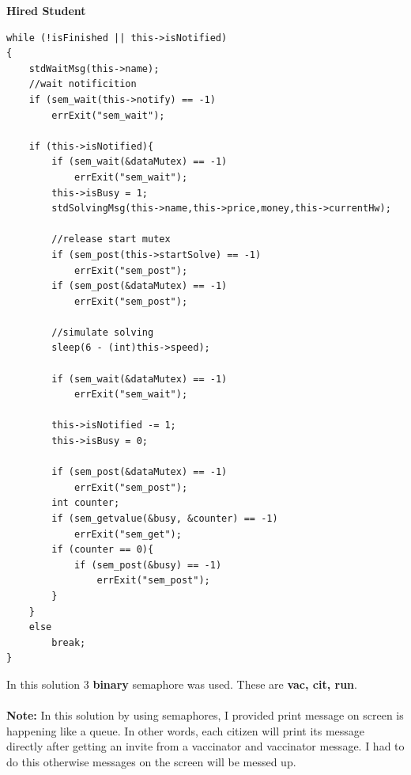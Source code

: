 \documentclass{article}
\begin{document}
\cleardoublepage
\textbf{Hired Student}
\begin{lstlisting}[style=CStyle]
while (!isFinished || this->isNotified)
{
	stdWaitMsg(this->name);
	//wait notificition
	if (sem_wait(this->notify) == -1)
		errExit("sem_wait");
		
	if (this->isNotified){
		if (sem_wait(&dataMutex) == -1)
			errExit("sem_wait");
		this->isBusy = 1;
		stdSolvingMsg(this->name,this->price,money,this->currentHw);
		
		//release start mutex
		if (sem_post(this->startSolve) == -1)
			errExit("sem_post");
		if (sem_post(&dataMutex) == -1)
			errExit("sem_post");

		//simulate solving
		sleep(6 - (int)this->speed);

		if (sem_wait(&dataMutex) == -1)
			errExit("sem_wait");
			
		this->isNotified -= 1;
		this->isBusy = 0;

		if (sem_post(&dataMutex) == -1)
			errExit("sem_post");
		int counter;
		if (sem_getvalue(&busy, &counter) == -1)
			errExit("sem_get");
		if (counter == 0){
			if (sem_post(&busy) == -1)
				errExit("sem_post");
		}
	}
	else
		break;
}
\end{lstlisting}

In this solution 3 \textbf{binary} semaphore was used. These are \textbf{vac, cit, run}. \\ \\
\textbf{Note:} In this solution by using semaphores, I provided print message on screen
is happening like a queue. In other words, each citizen will print its message directly after getting an invite
from a vaccinator and vaccinator message. I had to do this otherwise messages on the screen will be messed up.
\end{document}
